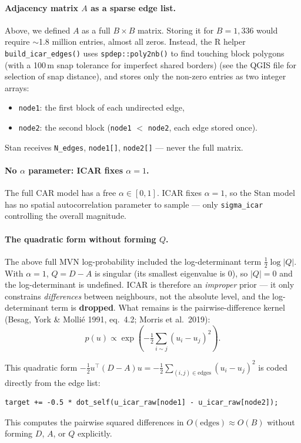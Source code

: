 \documentclass[12pt,a4paper]{article}
\begin{document}
\paragraph{Adjacency matrix $A$ as a sparse edge list.}
Above, we defined $A$ as a full $B \times B$ matrix. Storing it for $B = 1{,}336$ would require $\sim$1.8 million entries, almost all zeros. Instead, the R helper \texttt{build\_icar\_edges()} uses \texttt{spdep::poly2nb()} to find touching block polygons (with a 100\,m snap tolerance for imperfect shared borders) (see the QGIS file for selection of snap distance), and stores only the non-zero entries as two integer arrays:
\begin{itemize}
  \item \texttt{node1}: the first block of each undirected edge,
  \item \texttt{node2}: the second block (\texttt{node1} $<$ \texttt{node2}, each edge stored once).
\end{itemize}
Stan receives \texttt{N\_edges}, \texttt{node1[]}, \texttt{node2[]} --- never the full matrix.

\paragraph{No $\alpha$ parameter: ICAR fixes $\alpha = 1$.}
The full CAR model has a free $\alpha \in [0,1]$. ICAR fixes $\alpha = 1$, so the Stan model has no spatial autocorrelation parameter to sample — only \texttt{sigma\_icar} controlling the overall magnitude.

\paragraph{The quadratic form without forming $Q$.}
The above full MVN log-probability included the log-determinant term $\frac{1}{2}\log|Q|$. With $\alpha = 1$, $Q = D - A$ is singular (its smallest eigenvalue is 0), so $|Q| = 0$ and the log-determinant is undefined. ICAR is therefore an \emph{improper} prior — it only constrains \emph{differences} between neighbours, not the absolute level, and the log-determinant term is \textbf{dropped}. What remains is the pairwise-difference kernel (Besag, York \& Mollié 1991, eq.\ 4.2; Morris et al.\ 2019):
$$p(u) \propto \exp\!\left(-\tfrac{1}{2}\sum_{i \sim j}(u_i - u_j)^2\right).$$

This quadratic form $-\frac{1}{2}u^\top(D-A)u = -\frac{1}{2}\sum_{(i,j)\in\text{edges}}(u_i - u_j)^2$ is coded directly from the edge list:
\begin{verbatim}
target += -0.5 * dot_self(u_icar_raw[node1] - u_icar_raw[node2]);
\end{verbatim}
This computes the pairwise squared differences in $O(\text{edges}) \approx O(B)$ without forming $D$, $A$, or $Q$ explicitly.
\end{document}

